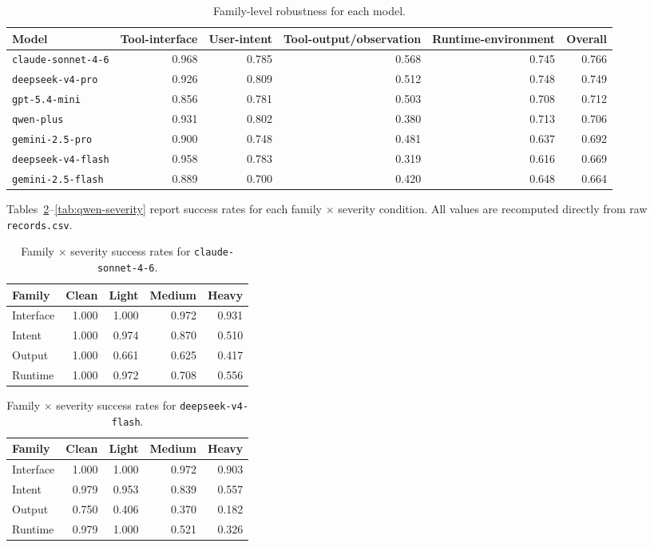 \documentclass[11pt]{article}
\begin{document}
\begin{table}[htbp]
\centering
\small
\begin{tabular}{lrrrrr}
\toprule
Model & Tool-interface & User-intent & Tool-output/observation & Runtime-environment & Overall \\
\midrule
\texttt{claude-sonnet-4-6} & 0.968 & 0.785 & 0.568 & 0.745 & 0.766 \\
\texttt{deepseek-v4-pro} & 0.926 & 0.809 & 0.512 & 0.748 & 0.749 \\
\texttt{gpt-5.4-mini} & 0.856 & 0.781 & 0.503 & 0.708 & 0.712 \\
\texttt{qwen-plus} & 0.931 & 0.802 & 0.380 & 0.713 & 0.706 \\
\texttt{gemini-2.5-pro} & 0.900 & 0.748 & 0.481 & 0.637 & 0.692 \\
\texttt{deepseek-v4-flash} & 0.958 & 0.783 & 0.319 & 0.616 & 0.669 \\
\texttt{gemini-2.5-flash} & 0.889 & 0.700 & 0.420 & 0.648 & 0.664 \\
\bottomrule
\end{tabular}
\caption{Family-level robustness for each model.}
\label{tab:family-overall}
\end{table}

Tables~\ref{tab:claude-severity}--\ref{tab:qwen-severity} report success rates for each family $\times$ severity condition. All values are recomputed directly from raw \texttt{records.csv}.

\begin{table}[htbp]
\centering
\small
\begin{tabular}{lrrrr}
\toprule
Family & Clean & Light & Medium & Heavy \\
\midrule
Interface & 1.000 & 1.000 & 0.972 & 0.931 \\
Intent & 1.000 & 0.974 & 0.870 & 0.510 \\
Output & 1.000 & 0.661 & 0.625 & 0.417 \\
Runtime & 1.000 & 0.972 & 0.708 & 0.556 \\
\bottomrule
\end{tabular}
\caption{Family $\times$ severity success rates for \texttt{claude-sonnet-4-6}.}
\label{tab:claude-severity}
\end{table}

\begin{table}[htbp]
\centering
\small
\begin{tabular}{lrrrr}
\toprule
Family & Clean & Light & Medium & Heavy \\
\midrule
Interface & 1.000 & 1.000 & 0.972 & 0.903 \\
Intent & 0.979 & 0.953 & 0.839 & 0.557 \\
Output & 0.750 & 0.406 & 0.370 & 0.182 \\
Runtime & 0.979 & 1.000 & 0.521 & 0.326 \\
\bottomrule
\end{tabular}
\caption{Family $\times$ severity success rates for \texttt{deepseek-v4-flash}.}
\label{tab:deepseek-flash-severity}
\end{table}
\end{document}
